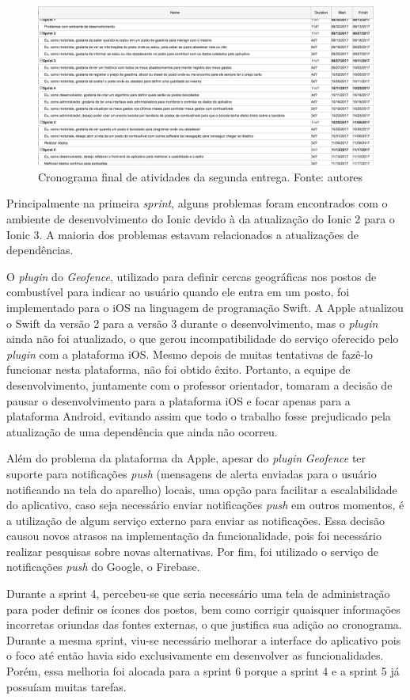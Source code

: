 \begin{figure}[H]
    \centering
    \includegraphics[scale=0.4]{figuras/cronograma_segunda_parte_2.png}
    \caption[Cronograma final de atividades da segunda entrega.]{Cronograma final de atividades da segunda entrega. Fonte: autores}
    \label{img:cronogramafinal}
\end{figure}

Principalmente na primeira \textit{sprint}, alguns problemas foram encontrados com o ambiente de desenvolvimento do Ionic devido à da atualização do Ionic 2 para o Ionic 3. A maioria dos problemas estavam relacionados a atualizações de dependências.

O \textit{plugin} do \textit{Geofence}, utilizado para definir cercas geográficas nos postos de combustível para indicar ao usuário quando ele entra em um posto, foi implementado para o iOS na linguagem de programação Swift. A Apple atualizou o Swift da versão 2 para a versão 3 durante o desenvolvimento, mas o \textit{plugin} ainda não foi atualizado, o que gerou incompatibilidade do serviço oferecido pelo \textit{plugin} com a plataforma iOS. Mesmo depois de muitas tentativas de fazê-lo funcionar nesta plataforma, não foi obtido êxito. Portanto, a equipe de desenvolvimento, juntamente com o professor orientador, tomaram a decisão de pausar o desenvolvimento para a plataforma iOS e focar apenas para a plataforma Android, evitando assim que todo o trabalho fosse prejudicado pela atualização de uma dependência que ainda não ocorreu.

Além do problema da plataforma da Apple, apesar do \textit{plugin} \textit{Geofence} ter suporte para notificações \textit{push} (mensagens de alerta enviadas para o usuário notificando na tela do aparelho) locais, uma opção para facilitar a escalabilidade do aplicativo, caso seja necessário enviar notificações \textit{push} em outros momentos, é a utilização de algum serviço externo para enviar as notificações. Essa decisão causou novos atrasos na implementação da funcionalidade, pois foi necessário realizar pesquisas sobre novas alternativas. Por fim, foi utilizado o serviço de notificações \textit{push} do Google, o Firebase.

Durante a sprint 4, percebeu-se que seria necessário uma tela de administração para poder definir os ícones dos postos, bem como corrigir quaisquer informações incorretas oriundas das fontes externas, o que justifica sua adição ao cronograma. Durante a mesma sprint, viu-se necessário melhorar a interface do aplicativo pois o foco até então havia sido exclusivamente em desenvolver as funcionalidades. Porém, essa melhoria foi alocada para a sprint 6 porque a sprint 4 e a sprint 5 já possuíam muitas tarefas.
